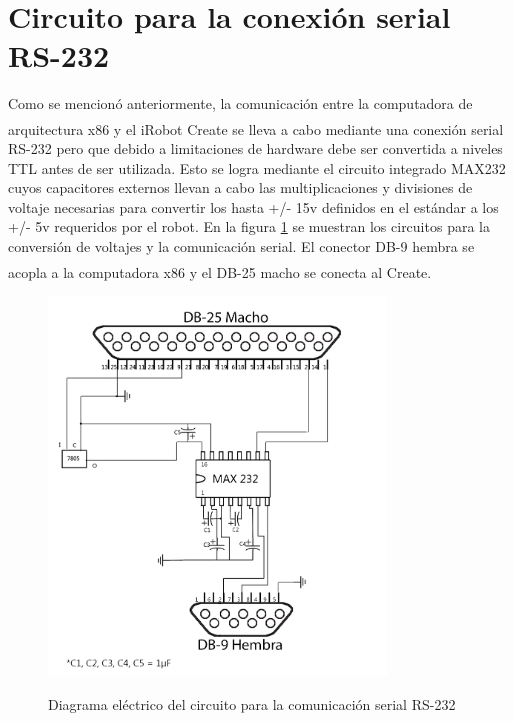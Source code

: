 \documentclass[letterpaper,openright,12pt]{book}
\begin{document}
\section{Circuito para la conexión serial RS-232}
Como se mencionó anteriormente, la comunicación entre la computadora de arquitectura x86 y el iRobot Create\textsuperscript{\textsuperscript{\textregistered}} se lleva a cabo mediante una conexión serial RS-232 pero que debido a limitaciones de hardware  debe ser convertida a niveles TTL antes de ser utilizada. Esto se logra mediante el circuito integrado MAX232 cuyos capacitores externos llevan a cabo las multiplicaciones y divisiones de voltaje necesarias para convertir los hasta +/- 15v  definidos en el estándar a los +/- 5v requeridos por el robot.
En la figura \ref{fig:diagramars232} se muestran los circuitos para la conversión de voltajes y la comunicación serial. El conector  DB-9 hembra se acopla a la computadora x86 y el DB-25 macho se conecta al Create\textsuperscript{\textsuperscript{\textregistered}}.
\begin{figure}
\begin{center}
\includegraphics[width=0.8\textwidth]{figures/max232.png}
\caption{Diagrama eléctrico del circuito para la comunicación serial RS-232}
\centering
\label{fig:diagramars232}
\end{center}
\end{figure} 
\end{document}
